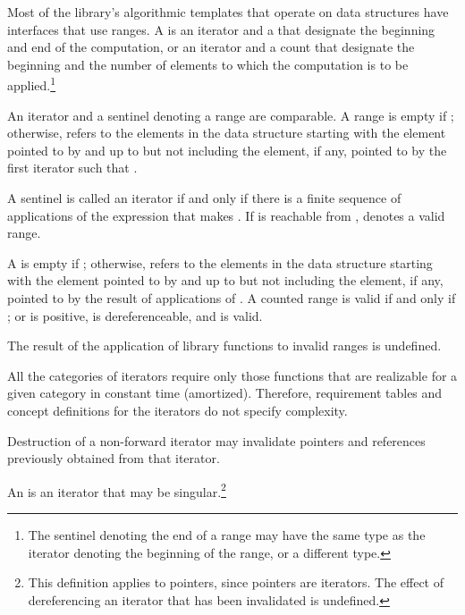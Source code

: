 \pnum
Most of the library's algorithmic templates that operate on data structures have
interfaces that use ranges. A  is an iterator and a 
that designate the beginning and end of the computation, or an iterator and a
count that designate the beginning and the number of elements to which the
computation is to be applied.\footnote{The sentinel denoting the end of a range
may have the same type as the iterator denoting the beginning of the range, or a
different type.}

\pnum
An iterator and a sentinel denoting a range are comparable.
A range 
is empty if ;
otherwise, 
refers to the elements in the data structure starting with the element
pointed to by
and up to but not including the element, if any, pointed to by
the first iterator  such that .

\pnum
A sentinel  is called  an iterator  if
and only if there is a finite sequence of applications of the expression
 that makes . If  is reachable from ,
 denotes a valid range.

\pnum
A   is empty if ;
otherwise,  refers to
the  elements in the data structure
starting with the element pointed to by  and up to but not including
the element, if any, pointed to by
the result of  applications of .
A counted range  is valid if and only if ;
or  is positive,  is dereferenceable,
and  is valid.

\pnum
The result of the application of library functions
to invalid ranges is undefined.

\pnum
All the categories of iterators require only those functions that are realizable for a given category in
constant time (amortized).
Therefore, requirement tables and concept definitions for the iterators
do not specify complexity.

\pnum
Destruction of a non-forward iterator may invalidate pointers and references
previously obtained from that iterator.

\pnum
An 
is an iterator that may be singular.\footnote{This definition applies to pointers, since pointers are iterators.
The effect of dereferencing an iterator that has been invalidated
is undefined.
}

